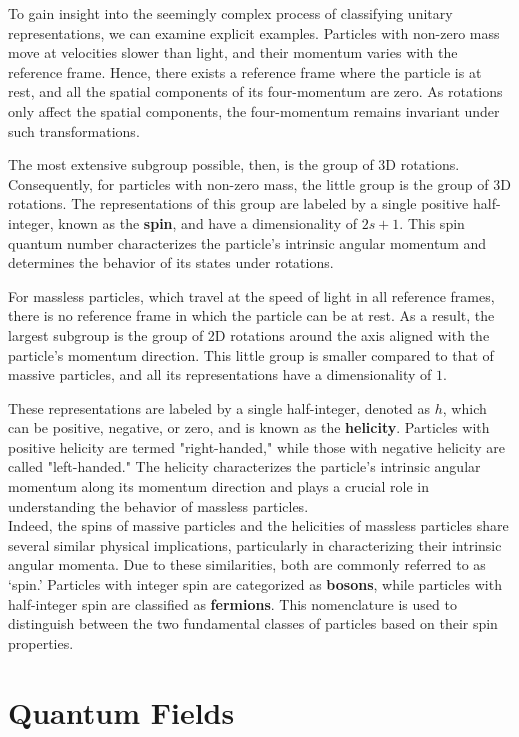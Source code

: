 \documentclass[12pt]{article}
\begin{document}
To gain insight into the seemingly complex process of classifying unitary representations, we can examine explicit examples. Particles with non-zero mass move at velocities slower than light, and their momentum varies with the reference frame. Hence, there exists a reference frame where the particle is at rest, and all the spatial components of its four-momentum are zero. As rotations only affect the spatial components, the four-momentum remains invariant under such transformations.

The most extensive subgroup possible, then, is the group of 3D rotations. Consequently, for particles with non-zero mass, the little group is the group of 3D rotations. The representations of this group are labeled by a single positive half-integer, known as the \textbf{spin}, and have a dimensionality of $2s+1$. This spin quantum number characterizes the particle's intrinsic angular momentum and determines the behavior of its states under rotations.


For massless particles, which travel at the speed of light in all reference frames, there is no reference frame in which the particle can be at rest. As a result, the largest subgroup is the group of 2D rotations around the axis aligned with the particle's momentum direction. This little group is smaller compared to that of massive particles, and all its representations have a dimensionality of $1$.

These representations are labeled by a single half-integer, denoted as $h$, which can be positive, negative, or zero, and is known as the \textbf{helicity}. Particles with positive helicity are termed "right-handed," while those with negative helicity are called "left-handed." The helicity characterizes the particle's intrinsic angular momentum along its momentum direction and plays a crucial role in understanding the behavior of massless particles.
\\

Indeed, the spins of massive particles and the helicities of massless particles share several similar physical implications, particularly in characterizing their intrinsic angular momenta. Due to these similarities, both are commonly referred to as `spin.' Particles with integer spin are categorized as \textbf{bosons}, while particles with half-integer spin are classified as \textbf{fermions}. This nomenclature is used to distinguish between the two fundamental classes of particles based on their spin properties.

\section{Quantum Fields}
\end{document}
